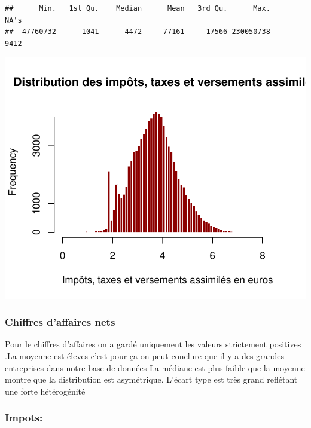 \documentclass[mstat,12pt]{unswthesis}
\begin{document}
\medskip

\begin{verbatim}
##      Min.   1st Qu.    Median      Mean   3rd Qu.      Max.      NA's 
## -47760732      1041      4472     77161     17566 230050738      9412
\end{verbatim}

\includegraphics{TDDT_projet_L_2_files/figure-latex/unnamed-chunk-42-1.pdf}

\medskip

\subsubsection{Chiffres d'affaires nets}\label{chiffres-daffaires-nets}

\medskip

Pour le chiffres d'affaires on a gardé uniquement les valeurs
strictement positives .La moyenne est éleves c'est pour ça on peut
conclure que il y a des grandes entreprises dans notre base de données
La médiane est plus faible que la moyenne montre que la distribution est
asymétrique. L'écart type est très grand reflétant une forte
hétérogénité

\medskip

\subsubsection{Impots:}\label{impots}

\medskip

\scriptsize
\end{document}
